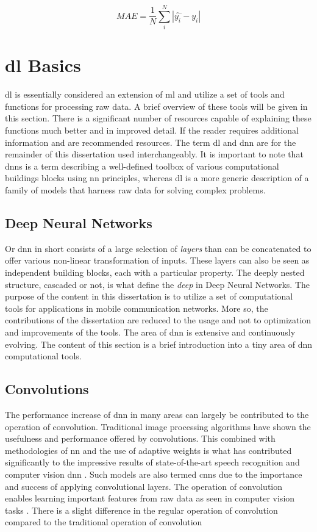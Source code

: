 \begin{equation}
    MAE =  \frac{1}{N} \sum_i^N |\hat{y_i} - y_i|
\end{equation}


\section{\acrlong{dl} Basics}\label{sec:dlbasics}

\gls{dl} is essentially considered an extension of \gls{ml} and utilize a set of tools and functions for processing raw data. A brief overview of these tools will be given in this section. There is a significant number of resources capable of explaining these functions much better and in improved detail. If the reader requires additional information \cite{Nielsen2015} and \cite{Goodfellow-et-al-2016} are recommended resources. The term \gls{dl} and \gls{dnn} are for the remainder of this dissertation used interchangeably. It is important to note that \glspl{dnn} is a term describing a well-defined toolbox of various computational buildings blocks using \gls{nn} principles, whereas \gls{dl} is a more generic description of a family of models that harness raw data for solving complex problems.

\subsection{Deep Neural Networks}
Or \gls{dnn} in short consists of a large selection of \emph{layers} than can be concatenated to offer various non-linear transformation of inputs. These layers can also be seen as independent building blocks, each with a particular property. The deeply nested structure, cascaded or not, is what define the \emph{deep} in Deep Neural Networks. The purpose of the content in this dissertation is to utilize a set of computational tools for applications in mobile communication networks. More so, the contributions of the dissertation are reduced to the usage and not to optimization and improvements of the tools. The area of \gls{dnn} is extensive and continuously evolving. The content of this section is a brief introduction into a tiny area of \gls{dnn} computational tools. 

\subsection{Convolutions}\label{sec:convolutions}
The performance increase of \gls{dnn} in many areas can largely be contributed to the operation of convolution. Traditional image processing algorithms have shown the usefulness and performance offered by convolutions. This combined with methodologies of \gls{nn} and the use of adaptive weights is what has contributed significantly to the impressive results of state-of-the-art speech recognition and computer vision \gls{dnn} \cite{Goodfellow-et-al-2016}. Such models are also termed \glspl{cnn} due to the importance and success of applying convolutional layers. The operation of convolution enables learning important features from raw data as seen in computer vision tasks \cite{LeCun2015}. There is a slight difference in the regular operation of convolution compared to the traditional operation of convolution

